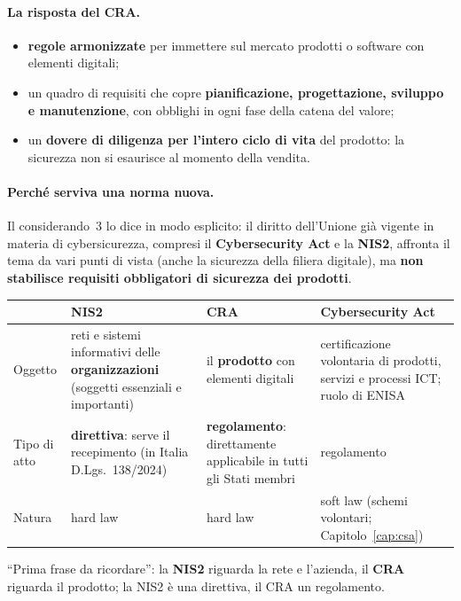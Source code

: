 \paragraph{La risposta del CRA.}
\begin{itemize}
  \item \textbf{regole armonizzate} per immettere sul mercato prodotti o software con elementi digitali;
  \item un quadro di requisiti che copre \textbf{pianificazione, progettazione, sviluppo e manutenzione},
    con obblighi in ogni fase della catena del valore;
  \item un \textbf{dovere di diligenza per l'intero ciclo di vita} del prodotto: la sicurezza non si
    esaurisce al momento della vendita.
\end{itemize}

\paragraph{Perché serviva una norma nuova.} Il considerando~3 lo dice in modo esplicito: il diritto
dell'Unione già vigente in materia di cybersicurezza, compresi il \textbf{Cybersecurity Act} e la
\textbf{NIS2}, affronta il tema da vari punti di vista (anche la sicurezza della filiera digitale), ma
\textbf{non stabilisce requisiti obbligatori di sicurezza dei prodotti}.

\begin{center}
\small
\begin{tabularx}{\linewidth}{>{\raggedright\arraybackslash}p{2.6cm} X X X}
\toprule
 & \textbf{NIS2} & \textbf{CRA} & \textbf{Cybersecurity Act}\\
\midrule
Oggetto & reti e sistemi informativi delle \textbf{organizzazioni} (soggetti essenziali e importanti)
  & il \textbf{prodotto} con elementi digitali & certificazione volontaria di prodotti, servizi e processi
  ICT; ruolo di ENISA\\
Tipo di atto & \textbf{direttiva}: serve il recepimento (in Italia D.Lgs.~138/2024)
  & \textbf{regolamento}: direttamente applicabile in tutti gli Stati membri & regolamento\\
Natura & hard law & hard law & soft law (schemi volontari; Capitolo~\ref{cap:csa})\\
\bottomrule
\end{tabularx}
\end{center}

\begin{esame}
``Prima frase da ricordare'': la \textbf{NIS2} riguarda la rete e l'azienda, il \textbf{CRA} riguarda il
prodotto; la NIS2 è una direttiva, il CRA un regolamento.
\end{esame}

